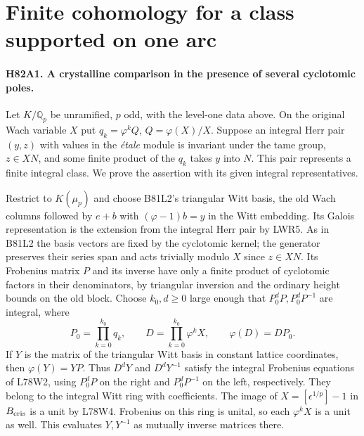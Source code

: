\section{Finite cohomology for a class supported on one arc}

\paragraph{H82A1. A crystalline comparison in the presence of several cyclotomic poles.}
Let $K/\mathbb Q_p$ be unramified, $p$ odd, with the level-one
data above. On the original Wach variable $X$ put
$q_k=\varphi^k Q$, $Q=\varphi(X)/X$. Suppose an integral Herr
pair $(y,z)$ with values in the \emph{\'etale} module is invariant
under the tame group, $z\in XN$, and some finite product of the
$q_k$ takes $y$ into $N$. This pair represents a finite integral
class. We prove the assertion with its given integral representatives.

Restrict to $K(\mu_p)$ and choose B81L2's triangular Witt basis,
the old Wach columns followed by $e+b$ with
$(\varphi-1)b=y$ in the Witt embedding. Its Galois representation
is the extension from the integral Herr pair by LWR5. As in B81L2
the basis vectors are fixed by the cyclotomic kernel; the generator
preserves their series span and acts trivially modulo $X$ since
$z\in XN$. Its Frobenius matrix $P$ and its inverse have only a
finite product of cyclotomic factors in their denominators, by
triangular inversion and the ordinary height bounds on the old
block. Choose $k_0,d\ge0$ large enough that
$P_0^dP,P_0^dP^{-1}$ are integral, where
\[
       P_0=\prod_{k=0}^{k_0}q_k,\qquad
       D=\prod_{k=0}^{k_0}\varphi^k X,\qquad
       \varphi(D)=DP_0 .
\]
If $Y$ is the matrix of the triangular Witt basis in constant
lattice coordinates, then $\varphi(Y)=YP$. Thus $D^dY$ and
$D^dY^{-1}$ satisfy the integral Frobenius equations of L78W2,
using $P_0^dP$ on the right and $P_0^dP^{-1}$ on the left,
respectively. They belong to the integral Witt ring with
coefficients. The image of $X=[\epsilon^{1/p}]-1$ in
$B_{\rm cris}$ is a unit by L78W4. Frobenius on this ring is
unital, so each $\varphi^k X$ is a unit as well. This evaluates
$Y,Y^{-1}$ as mutually inverse matrices there.

